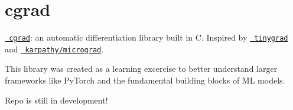 \chapter{cgrad}
\hypertarget{index}{}\label{index}
\label{index_md__2_users_2eugenebaek_2_documents_2cgrad_2_r_e_a_d_m_e}%
%
 

\href{https://github.com/ebsc0/cgrad}{\texttt{ cgrad}}\+: an automatic differentiation library built in C. Inspired by \href{https://github.com/tinygrad/tinygrad}{\texttt{ tinygrad}} and \href{https://github.com/karpathy/micrograd}{\texttt{ karpathy/micrograd}}.





This library was created as a learning excercise to better understand larger frameworks like Py\+Torch and the fundamental building blocks of ML models.

Repo is still in development! 